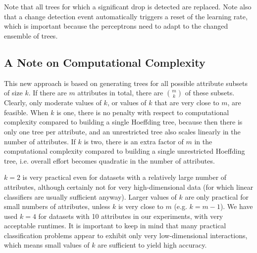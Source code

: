 Note that all trees for which a significant drop is detected are
replaced.  Note also that a change detection event automatically
triggers a reset of the learning rate, which is important because the
perceptrons need to adapt to the changed ensemble of trees.

\subsection{A Note on Computational Complexity}

This new approach is based on generating trees for all possible attribute
subsets of size $k$. If there are $m$ attributes in total, there are
${m}\choose{k}$ of these subsets.  Clearly, only moderate values of
$k$, or values of $k$ that are very close to $m$, are feasible.  When
$k$ is one, there is no penalty with respect to computational
complexity compared to building a single Hoeffding tree, because then
there is only one tree per attribute, and an unrestricted tree also
scales linearly in the number of attributes.  If $k$ is two, there is
an extra factor of $m$ in the computational complexity compared to
building a single unrestricted Hoeffding tree, i.e. overall effort
becomes quadratic in the number of attributes.

$k=2$ is very practical even for datasets with a relatively large
number of attributes, although certainly not for very high-dimensional
data (for which linear classifiers are usually sufficient
anyway). Larger values of $k$ are only practical for small numbers of
attributes, unless $k$ is very close to $m$ (e.g. $k=m-1$). We have
used $k=4$ for datasets with 10 attributes in our experiments, with
very acceptable runtimes. It is important to keep in mind that many
practical classification problems appear to exhibit only very
low-dimensional interactions, which means small values of $k$ are
sufficient to yield high accuracy.


